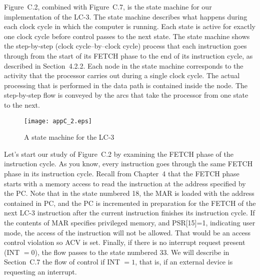 \documentclass{patt}
\begin{document}
Figure~C.2, combined with Figure~C.7, is the state machine for our 
implementation of the LC-3.
The state machine describes what happens during each clock cycle in
which the computer is running.  Each state is active for exactly one
clock cycle before control passes to the next state.  The state
machine shows the step-by-step (clock cycle--by--clock cycle) process
that each instruction goes through from the start of its FETCH phase 
to the end of its instruction cycle, as described in 
Section~4.2.2.  Each node in the state machine corresponds to the activity 
that the processor carries out during a single clock cycle.  The actual
processing that is performed in the data path is contained inside the
node.  The step-by-step flow is conveyed by the arcs that take the
processor from one state to the next.


\begin{figure}
\hspace*{-8pc}\begin{minipage}{36pc}
{\texttt{[image: appC\_2.eps]}} \caption{A state machine for the
LC-3} \label{fig:statemachine}
\end{minipage}
\end{figure}


Let's start our study of Figure~C.2 by examining the FETCH phase of the 
instruction cycle.  As you know, every instruction goes through the same 
FETCH phase in its instruction cycle.  Recall from Chapter~4 that the FETCH 
phase starts with a memory access to read the instruction at the address 
specified by the PC.  Note that in the state numbered 18, the MAR is loaded 
with the address contained in PC, and the PC is incremented in preparation 
for the FETCH of the next LC-3 instruction after the current instruction 
finishes its instruction cycle. If the contents of MAR specifies privileged 
memory, and PSR[15]=1, indicating user mode, the access of the instruction 
will not be allowed.   That would be an access control violation so ACV 
is set.  Finally, if there is no interrupt request present (INT $=0$), the 
flow passes to the state numbered 33. We will describe in Section~C.7 the 
flow of control if INT $=1$, that is, if an external device is requesting an 
interrupt.
\end{document}
